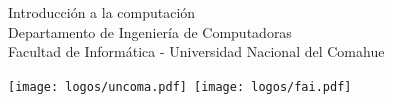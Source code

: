  {\centering \small 
    Introducción a la computación\\
    Departamento de Ingeniería de Computadoras \\
    Facultad de Informática - Universidad Nacional del Comahue \\
    \vspace{20pt} }
\makeatother

\vspace{-2.5cm}
\mbox{\hspace{-1cm}\texttt{[image: logos/uncoma.pdf]}\hspace{12cm}
    \texttt{[image: logos/fai.pdf]}}

